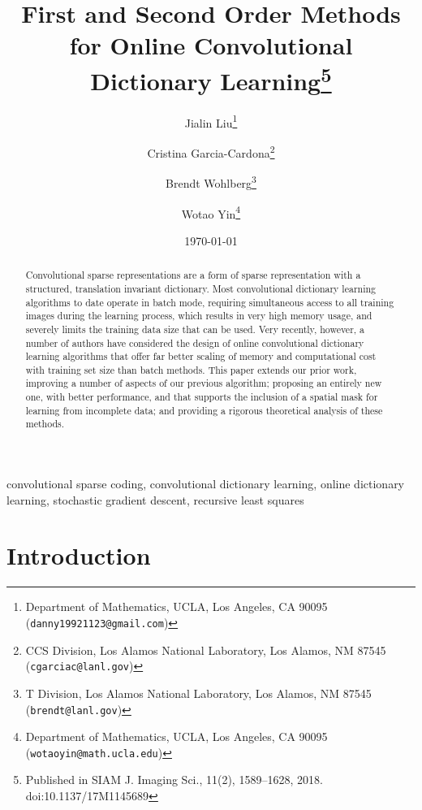 \documentclass[final]{siamart1116}
\date{\today}
\begin{document}
\title{First and Second Order Methods for Online Convolutional Dictionary Learning\thanks{Published in SIAM J. Imaging Sci., 11(2), 1589--1628, 2018. doi:10.1137/17M1145689
}}


\author{Jialin Liu\thanks{Department of Mathematics, UCLA, Los
    Angeles, CA 90095 (\texttt{danny19921123@gmail.com})}
  \and Cristina Garcia-Cardona\thanks{CCS Division, Los Alamos
    National Laboratory, Los Alamos, NM 87545 (\texttt{cgarciac@lanl.gov})}
  \and Brendt Wohlberg\thanks{T Division, Los Alamos
    National Laboratory, Los Alamos, NM 87545  (\texttt{brendt@lanl.gov})}
   \and Wotao Yin\thanks{Department of Mathematics, UCLA, Los
    Angeles, CA 90095 (\texttt{wotaoyin@math.ucla.edu})}
}


\maketitle


\begin{abstract}
Convolutional sparse representations are a form of sparse representation with a structured, translation invariant dictionary.  Most convolutional dictionary learning algorithms to date operate in batch mode, requiring simultaneous access to all training images during the learning process, which results in very high memory usage, and severely limits the training data size that can be used.  Very recently, however, a number of authors have considered the design of online convolutional dictionary learning algorithms that offer far better scaling of memory and computational cost with training set size than batch methods.  This paper extends our prior work, improving a number of aspects of our previous algorithm; proposing an entirely new one, with better performance, and that supports the inclusion of a spatial mask for learning from incomplete data; and providing a rigorous theoretical analysis of these methods.
\end{abstract}

\begin{keywords}
convolutional sparse coding, convolutional dictionary learning, online dictionary learning, stochastic gradient descent, recursive least squares
\end{keywords}


\section{Introduction}
\label{sec:intro}
\end{document}
